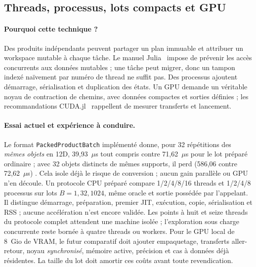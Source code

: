 \documentclass[11pt,a4paper]{article}
\newcommand{\code}[1]{\texttt{#1}}
\begin{document}
\subsection{Threads, processus, lots compacts et GPU}
\paragraph{Pourquoi cette technique ?}
Des produits indépendants peuvent partager un plan immuable et attribuer
un workspace mutable à chaque tâche. Le manuel Julia~\cite{juliathreads}
impose de prévenir les accès concurrents aux données mutables ; une tâche
peut migrer, donc un tampon indexé naïvement par numéro de thread ne suffit
pas. Des processus ajoutent démarrage, sérialisation et duplication des
états. Un GPU demande un véritable noyau de contraction de chemins,
avec données compactes et sorties définies ; les recommandations
CUDA.jl~\cite{cudaperf} rappellent de mesurer transferts et lancement.
\paragraph{Essai actuel et expérience à conduire.}
Le format \code{PackedProductBatch} implémenté donne, pour 32 répétitions des
\emph{mêmes objets} en 12D, 39,93~\(\mu\)s tout compris contre
71,62~\(\mu\)s pour le lot préparé ordinaire ; avec 32 objets distincts
de mêmes supports, il perd (586,06 contre 72,62~\(\mu\)s)
. Cela isole déjà le risque de conversion ; aucun gain
parallèle ou GPU n'en découle. Un protocole CPU préparé
 compare 1/2/4/8/16 threads et 1/2/4/8 processus
sur lots $B=1,32,1024$, même oracle et sortie possédée par l'appelant.
Il distingue démarrage, préparation, premier JIT, exécution, copie,
sérialisation et RSS ; aucune accélération n'est encore validée.
Les points à huit et seize threads du protocole complet attendent une
machine isolée ; l'exploration sous charge concurrente reste bornée à
quatre threads ou workers.
Pour le GPU local de 8~Gio de VRAM, le futur comparatif doit ajouter
empaquetage, transferts aller-retour, noyau \emph{synchronisé}, mémoire active,
précision et cas à données déjà résidentes. La taille du lot doit amortir
ces coûts avant toute revendication.
\end{document}
